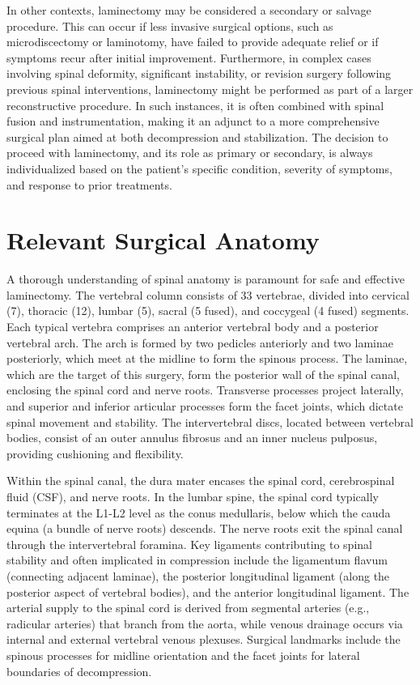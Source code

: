 In other contexts, laminectomy may be considered a secondary or salvage procedure. This can occur if less invasive surgical options, such as microdiscectomy or laminotomy, have failed to provide adequate relief or if symptoms recur after initial improvement. Furthermore, in complex cases involving spinal deformity, significant instability, or revision surgery following previous spinal interventions, laminectomy might be performed as part of a larger reconstructive procedure. In such instances, it is often combined with spinal fusion and instrumentation, making it an adjunct to a more comprehensive surgical plan aimed at both decompression and stabilization. The decision to proceed with laminectomy, and its role as primary or secondary, is always individualized based on the patient's specific condition, severity of symptoms, and response to prior treatments.

\section*{Relevant Surgical Anatomy}
A thorough understanding of spinal anatomy is paramount for safe and effective laminectomy. The vertebral column consists of 33 vertebrae, divided into cervical (7), thoracic (12), lumbar (5), sacral (5 fused), and coccygeal (4 fused) segments. Each typical vertebra comprises an anterior vertebral body and a posterior vertebral arch. The arch is formed by two pedicles anteriorly and two laminae posteriorly, which meet at the midline to form the spinous process. The laminae, which are the target of this surgery, form the posterior wall of the spinal canal, enclosing the spinal cord and nerve roots. Transverse processes project laterally, and superior and inferior articular processes form the facet joints, which dictate spinal movement and stability. The intervertebral discs, located between vertebral bodies, consist of an outer annulus fibrosus and an inner nucleus pulposus, providing cushioning and flexibility.

Within the spinal canal, the dura mater encases the spinal cord, cerebrospinal fluid (CSF), and nerve roots. In the lumbar spine, the spinal cord typically terminates at the L1-L2 level as the conus medullaris, below which the cauda equina (a bundle of nerve roots) descends. The nerve roots exit the spinal canal through the intervertebral foramina. Key ligaments contributing to spinal stability and often implicated in compression include the ligamentum flavum (connecting adjacent laminae), the posterior longitudinal ligament (along the posterior aspect of vertebral bodies), and the anterior longitudinal ligament. The arterial supply to the spinal cord is derived from segmental arteries (e.g., radicular arteries) that branch from the aorta, while venous drainage occurs via internal and external vertebral venous plexuses. Surgical landmarks include the spinous processes for midline orientation and the facet joints for lateral boundaries of decompression.

